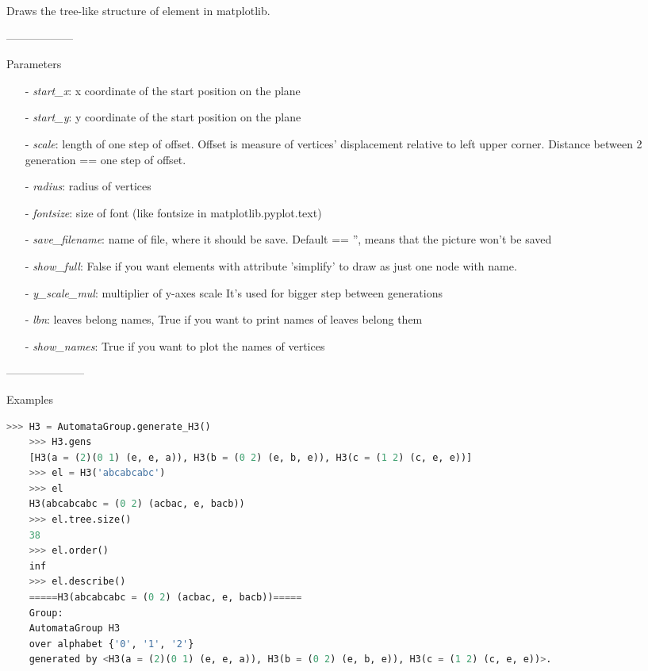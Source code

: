 \documentclass[a4paper,12pt]{amsart}
\begin{document}
\begin{itemize}
\begin{itemize}
		Draws the tree-like structure of element in matplotlib.
		
		------------------
		
		Parameters
		
		\begin{itemize}
			\item[-] \textit{start\_x}: x coordinate of the start position on the plane
			
			\item[-] \textit{start\_y}: y coordinate of the start position on the plane
			
			\item[-] \textit{scale}: length of one step of offset.
			Offset is measure of vertices' displacement relative to
			left upper corner. Distance between 2 generation == one
			step of offset. 
			
			\item[-] \textit{radius}: radius of vertices
			
			\item[-] \textit{fontsize}: size of font (like fontsize in matplotlib.pyplot.text)
			
			\item[-] \textit{save\_filename}: name of file, where it should be save. Default == '', means that the picture won't be saved		
			
			\item[-] \textit{show\_full}: False if you want elements with attribute 'simplify' to draw as just one node with name.
			
			\item[-] \textit{y\_scale\_mul}: multiplier of y-axes scale
			It's used for bigger step between generations
			
			\item[-] \textit{lbn}: leaves belong names, True if you want to print names of leaves belong them
			
			\item[-] \textit{show\_names}: True if you want to plot the names of vertices
			
		\end{itemize}
	\end{itemize}

	---------------------

	Examples
	
	\begin{lstlisting}[language=python]
	>>> H3 = AutomataGroup.generate_H3()
	>>> H3.gens
	[H3(a = (2)(0 1) (e, e, a)), H3(b = (0 2) (e, b, e)), H3(c = (1 2) (c, e, e))]
	>>> el = H3('abcabcabc')
	>>> el
	H3(abcabcabc = (0 2) (acbac, e, bacb))
	>>> el.tree.size()
	38
	>>> el.order()
	inf
	>>> el.describe()
    =====H3(abcabcabc = (0 2) (acbac, e, bacb))=====
	Group:     
	AutomataGroup H3
	over alphabet {'0', '1', '2'}
	generated by <H3(a = (2)(0 1) (e, e, a)), H3(b = (0 2) (e, b, e)), H3(c = (1 2) (c, e, e))>.
	

\end{lstlisting}
\end{itemize}
\end{document}
